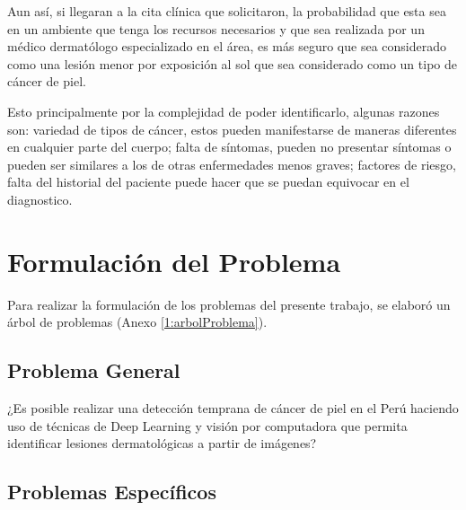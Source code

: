Aun así, si llegaran a la cita clínica que solicitaron, la probabilidad que esta sea en un ambiente que tenga los recursos necesarios y que sea realizada por un médico dermatólogo especializado en el área, es más seguro que sea considerado como una lesión menor por exposición al sol que sea considerado como un tipo de cáncer de piel. 

Esto principalmente por la complejidad de poder identificarlo, algunas razones son: variedad de tipos de cáncer, estos pueden manifestarse de maneras diferentes en cualquier parte del cuerpo; falta de síntomas, pueden no presentar síntomas o pueden ser similares a los de otras enfermedades menos graves; factores de riesgo, falta del historial del paciente puede hacer que se puedan equivocar en el diagnostico.




\section{Formulación del Problema}

Para realizar la formulación de los problemas del presente trabajo, se elaboró un árbol de problemas (Anexo \ref{1:arbolProblema}).

\subsection{Problema General}
\newcommand{\ProblemaGeneral}{¿Es posible realizar una detección temprana de cáncer de piel en el Perú  haciendo uso de técnicas de Deep Learning y visión por computadora que permita identificar lesiones dermatológicas a partir de imágenes?
}
\ProblemaGeneral
\subsection{Problemas Espec\'{i}ficos}
\newcommand{\Pbone}{
¿Cuáles son los algoritmos de Deep Learning que pueden clasificar con precisión los melanomas y no melanomas entre pacientes peruanos?
}
\newcommand{\Pbtwo}{
¿Cómo evaluar y medir la precisión de los modelos de Deep Learning en la detección de cáncer de piel de tipo melanomas y no melanomas entre pacientes peruanos? 
}
\newcommand{\Pbthree}{
¿Qué tipo de ruido pude haber en las imagenes que dificulté la clasificación de los melanomas y no melanomas entre pacientes peruanos?
}
\newcommand{\Pbfour}{
¿ Qué alternativas se proponen en los trabajos previos para seleccionar características y desarrollar el marco de trabajo de la investigación?
}
\newcommand{\Pbfive}{
¿Cuál es la influencia de las condiciones ambientales y geográficas específicas de Perú en el tratamiento del cáncer de piel?
}

